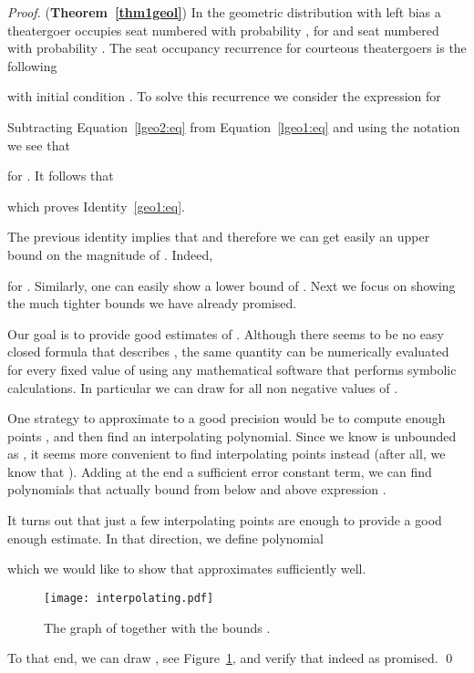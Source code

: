 \documentclass[11pt]{llncs}
\begin{document}
\begin{proof} ({\bf Theorem~\ref{thm1geol}})
In the geometric distribution with left bias a theatergoer
occupies seat numbered  with probability
, for  and seat numbered 
with probability . 
The seat occupancy
recurrence for courteous theatergoers is the following

with initial condition .
To solve this recurrence we consider the expression for 

Subtracting Equation~\eqref{lgeo2:eq} from Equation~\eqref{lgeo1:eq}
and using the notation  we see that

for .
It follows that

which proves Identity~\eqref{geo1:eq}.

The previous identity implies that
 and therefore
we can get easily an upper bound on the magnitude of
. Indeed,

for . Similarly, one can easily show a lower bound of . Next we focus on showing the much tighter bounds we have already promised. 

Our goal is to provide good estimates of . Although there seems to be no easy closed formula that describes , the same quantity can be numerically evaluated for every fixed value of  using any mathematical software that performs symbolic calculations. In particular we can draw  for all non negative values of . 

One strategy to approximate  to a good precision would be to compute enough points , and then find an interpolating polynomial. Since we know  is unbounded as , it seems more convenient to find interpolating points  instead (after all, we know that ). Adding at the end a sufficient error constant term, we can find polynomials that actually bound from below and above expression . 

It turns out that just a few interpolating points are enough to provide a good enough estimate. In that direction, we define polynomial 

which we would like to show that approximates  sufficiently well. 
\begin{figure}[!htb]
\begin{center}
\texttt{[image: interpolating.pdf]}\caption{The graph of  together with the bounds .}
\label{fig: interpolation}
\end{center}
\end{figure}
To that end, we can draw , see Figure~\ref{fig: interpolation}, and verify that indeed  as promised. 
\qed
\end{proof}
\end{document}
